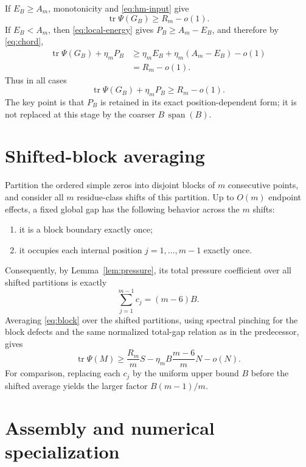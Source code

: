 \documentclass[11pt]{article}
\theoremstyle{remark}
\newcommand{\tr}{\operatorname{tr}}
\begin{document}
If $E_B\ge A_m$, monotonicity and \eqref{eq:hm-input} give
\[
\tr\Psi(G_B)\ge R_m-o(1).
\]
If $E_B<A_m$, then \eqref{eq:local-energy} gives $P_B\ge A_m-E_B$, and therefore by \eqref{eq:chord},
\begin{align*}
\tr\Psi(G_B)+\eta_mP_B
&\ge \eta_mE_B+\eta_m(A_m-E_B)-o(1)\\
&=R_m-o(1).
\end{align*}
Thus in all cases
\begin{equation}\label{eq:block}
\tr\Psi(G_B)+\eta_mP_B\ge R_m-o(1).
\end{equation}
The key point is that $P_B$ is retained in its exact position-dependent form; it is not replaced at this stage by the coarser $B\,\operatorname{span}(B)$.

\section{Shifted-block averaging}

Partition the ordered simple zeros into disjoint blocks of $m$ consecutive points, and consider all $m$ residue-class shifts of this partition. Up to $O(m)$ endpoint effects, a fixed global gap has the following behavior across the $m$ shifts:
\begin{enumerate}[label=(\roman*)]
\item it is a block boundary exactly once;
\item it occupies each internal position $j=1,\ldots,m-1$ exactly once.
\end{enumerate}
Consequently, by Lemma~\ref{lem:pressure}, its total pressure coefficient over all shifted partitions is exactly
\begin{equation}\label{eq:shift-multiplicity}
\sum_{j=1}^{m-1}c_j=(m-6)B.
\end{equation}
Averaging \eqref{eq:block} over the shifted partitions, using spectral pinching for the block defects and the same normalized total-gap relation as in the predecessor, gives
\begin{equation}\label{eq:global-defect}
\tr\Psi(M)
\ge \frac{R_m}{m}S
-\eta_mB\frac{m-6}{m}N
-o(N).
\end{equation}
For comparison, replacing each $c_j$ by the uniform upper bound $B$ before the shifted average yields the larger factor $B(m-1)/m$.

\section{Assembly and numerical specialization}
\end{document}
